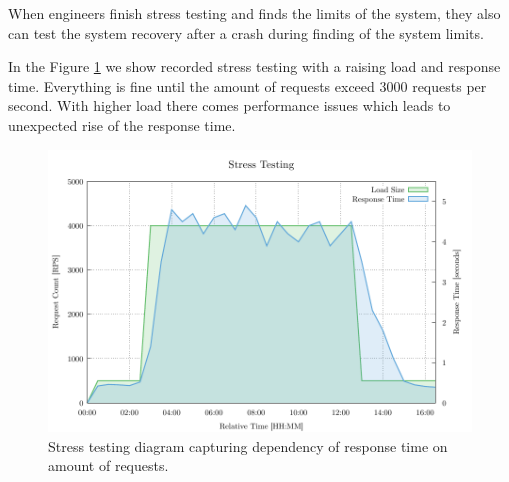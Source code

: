 When engineers finish stress testing and finds the limits of the system, they also can test the system recovery after a crash during finding of the system limits.

In the Figure \ref{fig:stress_test} we show recorded stress testing with a raising load and response time. Everything is fine until the amount of requests exceed 3000 requests per second. With higher load there comes performance issues which leads to unexpected rise of the response time.

\begin{figure}[H]
  \centering
  \includegraphics[width=15cm]{obrazky-figures/stress_testing.pdf}
  \caption{Stress testing diagram capturing dependency of response time on amount of requests.}
  \label{fig:stress_test}
\end{figure}

